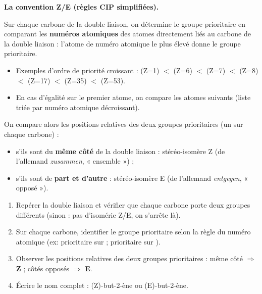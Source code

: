 \documentclass[11pt]{article}
\newcommand{\cle}[1]{{\popxbold\color{popdark}#1}}
\begin{document}
\textbf{La convention Z/E (règles CIP simplifiées).}\par
Sur chaque carbone de la double liaison, on détermine le \cle{groupe prioritaire} en comparant les \textbf{numéros atomiques} des atomes directement liés au carbone de la double liaison : l'atome de numéro atomique le plus élevé donne le groupe prioritaire.
\begin{itemize}
\item Exemples d'ordre de priorité croissant :  (Z=1) $<$  (Z=6) $<$  (Z=7) $<$  (Z=8) $<$  (Z=17) $<$  (Z=35) $<$  (Z=53).
\item En cas d'égalité sur le premier atome, on compare les atomes suivants (liste triée par numéro atomique décroissant).
\end{itemize}
On compare alors les positions relatives des deux groupes prioritaires (un sur chaque carbone) :
\begin{itemize}
\item s'ils sont du \textbf{même côté} de la double liaison : stéréo-isomère \cle{Z} (de l'allemand \emph{zusammen}, « ensemble ») ;
\item s'ils sont de \textbf{part et d'autre} : stéréo-isomère \cle{E} (de l'allemand \emph{entgegen}, « opposé »).
\end{itemize}

\begin{methode}
\begin{enumerate}
\item Repérer la double liaison  et vérifier que chaque carbone porte deux groupes différents (sinon : pas d'isomérie Z/E, on s'arrête là).
\item Sur chaque carbone, identifier le groupe prioritaire selon la règle du numéro atomique (ex:  prioritaire sur  ;  prioritaire sur ).
\item Observer les positions relatives des deux groupes prioritaires : même côté $\Rightarrow$ \textbf{Z} ; côtés opposés $\Rightarrow$ \textbf{E}.
\item Écrire le nom complet : (Z)-but-2-ène ou (E)-but-2-ène.
\end{enumerate}
\end{methode}
\end{document}
